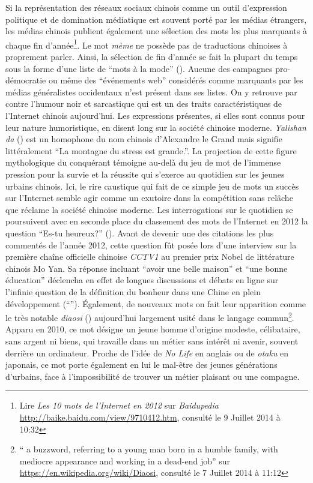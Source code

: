 Si la représentation des réseaux sociaux chinois comme un outil d'expression politique et de domination médiatique est souvent porté par les médias étrangers, les médias chinois publient également une sélection des mots les plus marquants à chaque fin d'année\footnote{Lire \textit{Les 10 mots de l'Internet en 2012} sur \textit{Baidupedia} \url{http://baike.baidu.com/view/9710412.htm}, consulté le 9 Juillet 2014 à 10:32}. Le mot \textit{mème} ne possède pas de traductions chinoises à proprement parler. Ainsi, la sélection de fin d'année se fait la plupart du temps sous la forme d'une liste de ``mots à la mode'' (). Aucune des campagnes pro-démocratie ou même des ``événements web'' considérés comme marquants par les médias généralistes occidentaux n'est présent dans ses listes. On y retrouve par contre l'humour noir et sarcastique qui est un des traits caractéristiques de l'Internet chinois aujourd'hui. Les expressions présentes, si elles sont connus pour leur nature humoristique, en disent long sur la société chinoise moderne. \textit{Yalishan da} () est un homophone du nom chinois d'Alexandre le Grand mais signifie littéralement ``La montagne du stress est grande.''. La projection de cette figure mythologique du conquérant témoigne au-delà du jeu de mot de l'immense pression pour la survie et la réussite qui s'exerce au quotidien sur les jeunes urbains chinois. Ici, le rire caustique qui fait de ce simple jeu de mots un succès sur l'Internet semble agir comme un exutoire dans la compétition sans relâche que réclame la société chinoise moderne. Les interrogations sur le quotidien se poursuivent avec en seconde place du classement des mots de l'Internet en 2012 la question ``Es-tu heureux?'' (). Avant de devenir une des citations les plus commentés de l'année 2012, cette question fût posée lors d'une interview sur la première chaîne officielle chinoise \textit{CCTV1} au premier prix Nobel de littérature chinois Mo Yan. Sa réponse incluant ``avoir une belle maison'' et ``une bonne éducation'' déclencha en effet de longues discussions et débats en ligne sur l'infinie question de la définition du bonheur dans une Chine en plein développement (``''). Également, de nouveaux mots on fait leur apparition comme le très notable \textit{diaosi} () aujourd'hui largement usité dans le langage commun\footnote{`` a buzzword, referring to a young man born in a humble family, with mediocre appearance and working in a dead-end job'' sur \url{https://en.wikipedia.org/wiki/Diaosi}, consulté le 7 Juillet 2014 à 11:12}. Apparu en 2010, ce mot désigne un jeune homme d'origine modeste, célibataire, sans argent ni biens, qui travaille dans un métier sans intérêt ni avenir, souvent derrière un ordinateur. Proche de l'idée de \textit{No Life} en anglais ou de \textit{otaku} en japonais, ce mot porte également en lui le mal-être des jeunes générations d'urbains, face à l'impossibilité de trouver un métier plaisant ou une compagne. 

